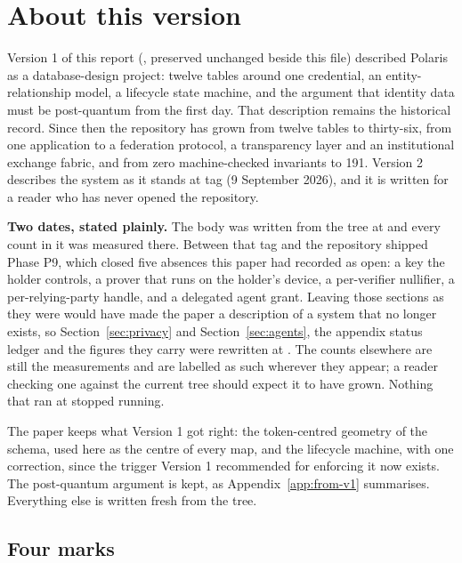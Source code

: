 \section*{About this version}

Version 1 of this report (, preserved unchanged beside this
file) described Polaris as a database-design project: twelve tables around one credential, an
entity-relationship model, a lifecycle state machine, and the argument that identity data must be
post-quantum from the first day. That description remains the historical record. Since then the
repository has grown from twelve tables to thirty-six, from one
application to a federation protocol, a transparency layer and an institutional exchange fabric,
and from zero machine-checked invariants to 191. Version 2 describes the system as it stands at
tag  (9 September 2026), and it is written for a reader who has never opened the
repository.

\textbf{Two dates, stated plainly.} The body was written from the tree at  and every
count in it was measured there. Between that tag and  the repository shipped Phase P9,
which closed five absences this paper had recorded as open: a key the holder controls, a prover that
runs on the holder's device, a per-verifier nullifier, a per-relying-party handle, and a delegated
agent grant. Leaving those sections as they were would have made the paper a description of a system
that no longer exists, so Section~\ref{sec:privacy} and Section~\ref{sec:agents}, the appendix
status ledger and the figures they carry were rewritten at . The counts elsewhere are
still the  measurements and are labelled as such wherever they appear; a reader
checking one against the current tree should expect it to have grown. Nothing that ran at
 stopped running.

The paper keeps what Version 1 got right: the token-centred geometry of the schema, used here as
the centre of every map, and the lifecycle machine, with one correction, since the trigger Version 1
recommended for enforcing it now exists.
The post-quantum argument is kept, as Appendix~\ref{app:from-v1} summarises. Everything else is
written fresh from the tree.

\subsection*{Four marks}

